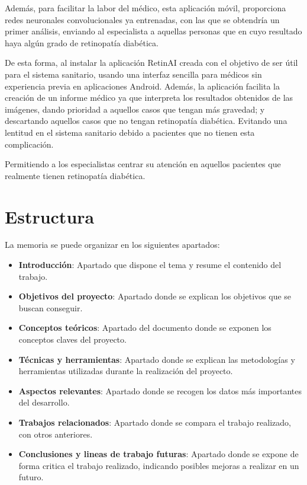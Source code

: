 Además, para facilitar la labor del médico, esta aplicación móvil, proporciona redes neuronales convolucionales ya entrenadas, con las que se obtendría un primer análisis, enviando al especialista a aquellas personas que en cuyo resultado haya algún grado de retinopatía diabética. 

De esta forma, al instalar la aplicación RetinAI creada con el objetivo de ser útil para el sistema sanitario, usando una interfaz sencilla para médicos sin experiencia previa en aplicaciones Android. Además, la aplicación facilita la creación de un informe médico ya que interpreta los resultados obtenidos de las imágenes, dando prioridad a aquellos casos que tengan más gravedad; y descartando aquellos casos que no tengan retinopatía diabética. Evitando una lentitud en el sistema sanitario debido a pacientes que no tienen esta complicación. 

Permitiendo a los especialistas centrar su atención en aquellos pacientes que realmente tienen retinopatía diabética.

\section{Estructura}
La memoria se puede organizar en los siguientes apartados:
\begin{itemize}
    \item \textbf{Introducción}: Apartado que dispone el tema y resume el contenido del trabajo.
    \item \textbf{Objetivos del proyecto}: Apartado donde se explican los objetivos que se buscan conseguir.
    \item \textbf{Conceptos teóricos}: Apartado del documento donde se exponen los conceptos claves del proyecto.
    \item \textbf{Técnicas y herramientas}: Apartado donde se explican las metodologías y herramientas utilizadas durante la realización del proyecto.
    \item \textbf{Aspectos relevantes}: Apartado donde se recogen los datos más importantes del desarrollo.
    \item \textbf{Trabajos relacionados}: Apartado donde se compara el trabajo realizado, con otros anteriores.
    \item \textbf{Conclusiones y lineas de trabajo futuras}: Apartado donde se expone de forma critica el trabajo realizado, indicando posibles mejoras a realizar en un futuro.
\end{itemize}

